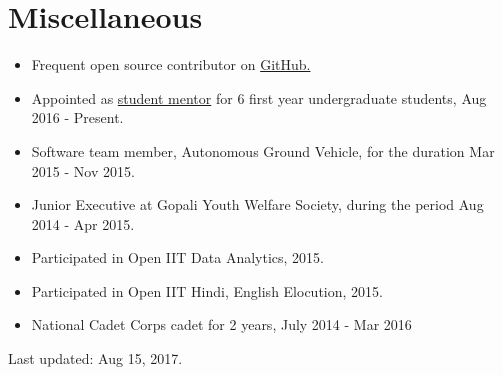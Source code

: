 \documentclass[10pt,a4paper]{moderncv}
\newcommand{\newlink}[2]{
  \href{#1}{\color{blue}#2}
}
\begin{document}
\section*{Miscellaneous}
\begin{itemize}
  \setlength\itemsep{0.5em}
  \item Frequent open source contributor on \newlink{https://github.com/kaustubhhiware}{GitHub.}
  \item Appointed as \href{https://drive.google.com/file/d/0B5iU6cWw36rOc0gzcjZPRTd5SkU/view}{student mentor} for 6 first year undergraduate students, Aug 2016 - Present.
  \item Software team member, Autonomous Ground Vehicle, for the duration Mar 2015 - Nov 2015.
  \item Junior Executive at Gopali Youth Welfare Society, during the period Aug 2014 - Apr 2015.
  \item Participated in Open IIT Data Analytics, 2015.
  \item Participated in Open IIT Hindi, English Elocution, 2015.
  \item National Cadet Corps cadet for 2 years, July 2014 - Mar 2016
\end{itemize}

	\vspace*{\fill}
	\begin{flushright}
	\footnotesize Last updated: Aug 15, 2017.
	\end{flushright}
\end{document}
